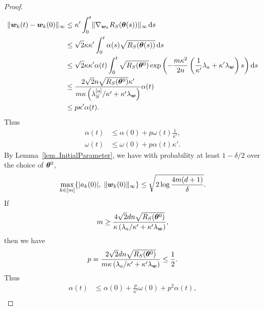 \documentclass{article}
\begin{document}
\begin{proof}
\begin{equation*}
        \begin{aligned}
            \lVert\bm{w}_k(t) - \bm{w}_k(0)\rVert_{\infty}
             & \leq \kappa'\int_{0}^{t} \lVert\nabla_{\bm{w}_k}R_S(\bm{\theta}(s))\rVert_{\infty}\mathop{}\!\mathrm{d}{s}                                                                                                     \\
             & \leq \sqrt{2}\kappa\kappa' \int_{0}^t \alpha(s)\sqrt{R_S(\bm{\theta}(s))} \mathop{}\!\mathrm{d}{s}                                                                                                     \\
             & \leq \sqrt{2}\kappa\kappa' \alpha(t) \int_{0}^{t} \sqrt{R_S(\bm{\theta}^0)}\exp\left(-\frac{m\kappa^2}{2n}\left(\frac{1}{\kappa'}\lambda_a+\kappa'\lambda_{\bm{w}}\right)s\right)\mathop{}\!\mathrm{d}{s} \\
             & \leq \frac{2\sqrt{2}n\sqrt{R_S(\bm{\theta}^0)}\kappa'}{m\kappa\left(\lambda^{[a]}_S/\kappa'+\kappa'\lambda_{\bm{w}}\right)}\alpha(t)                                                      \\
             & \leq p\kappa'\alpha(t).
        \end{aligned}
    \end{equation*}
    Thus
    \begin{equation*}
        \begin{aligned}
            \alpha(t) & \leq\alpha(0)+p\omega(t)\frac{1}{\kappa'}, \\
            \omega(t) & \leq\omega(0)+p\alpha(t)\kappa'.
        \end{aligned}
    \end{equation*}
    By Lemma~\ref{lem..InitialParameter}, we have with probability at least $1 - \delta/2$ over the choice of $\bm{\theta}^0$,
    \begin{equation*}
        \max\limits_{k\in[m]}\{\lvert a_k(0)\rvert,\;\lVert\bm{w}_k(0)\rVert_{\infty}\}\leq \sqrt{2\log\frac{4m(d+1)}{\delta}}.
    \end{equation*}
    If
    \begin{equation*}
        m \geq \frac{4\sqrt{2}dn\sqrt{R_S(\bm{\theta}^0)}}{\kappa\left(\lambda_a/\kappa'+\kappa'\lambda_{\bm{w}}\right)},
    \end{equation*}
    then we have
    \begin{equation*}
        p=\frac{2\sqrt{2}dn\sqrt{R_S(\bm{\theta}^0)}}{m\kappa\left(\lambda_a/\kappa'+\kappa'\lambda_{\bm{w}}\right)}\leq \frac{1}{2}.
    \end{equation*}
    Thus
    \begin{align*}
        \alpha(t) & \leq\alpha(0)+\frac{p}{\kappa'}\omega(0)+p^2\alpha(t),          \\

\end{align*}
\end{proof}
\end{document}
